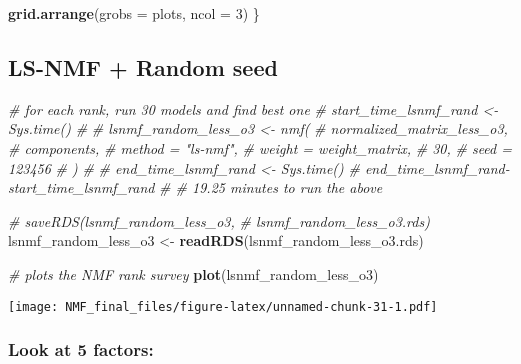 \documentclass[
]{article}
\newenvironment{Shaded}{\begin{snugshade}}{\end{snugshade}}
\newcommand{\AttributeTok}[1]{\textcolor[rgb]{0.13,0.29,0.53}{#1}}
\newcommand{\CommentTok}[1]{\textcolor[rgb]{0.56,0.35,0.01}{\textit{#1}}}
\newcommand{\DecValTok}[1]{\textcolor[rgb]{0.00,0.00,0.81}{#1}}
\newcommand{\FunctionTok}[1]{\textcolor[rgb]{0.13,0.29,0.53}{\textbf{#1}}}
\newcommand{\NormalTok}[1]{#1}
\newcommand{\OtherTok}[1]{\textcolor[rgb]{0.56,0.35,0.01}{#1}}
\newcommand{\SpecialCharTok}[1]{\textcolor[rgb]{0.81,0.36,0.00}{\textbf{#1}}}
\newcommand{\StringTok}[1]{\textcolor[rgb]{0.31,0.60,0.02}{#1}}
\begin{document}
\begin{Shaded}
\begin{Highlighting}[]
  
  \FunctionTok{grid.arrange}\NormalTok{(}\AttributeTok{grobs =}\NormalTok{ plots, }\AttributeTok{ncol =} \DecValTok{3}\NormalTok{)}
\NormalTok{\}}
\end{Highlighting}
\end{Shaded}

\subsection{LS-NMF + Random seed}\label{ls-nmf-random-seed}

\begin{Shaded}
\begin{Highlighting}[]
\CommentTok{\# for each rank, run 30 models and find best one}
\CommentTok{\# start\_time\_lsnmf\_rand \textless{}{-} Sys.time()}
\CommentTok{\# }
\CommentTok{\# lsnmf\_random\_less\_o3 \textless{}{-} nmf(}
\CommentTok{\#   normalized\_matrix\_less\_o3,}
\CommentTok{\#   components,}
\CommentTok{\#   method = "ls{-}nmf",}
\CommentTok{\#   weight = weight\_matrix,}
\CommentTok{\#   30,}
\CommentTok{\#   seed = 123456}
\CommentTok{\# )}
\CommentTok{\# }
\CommentTok{\# end\_time\_lsnmf\_rand \textless{}{-} Sys.time()}
\CommentTok{\# end\_time\_lsnmf\_rand{-}start\_time\_lsnmf\_rand}
\CommentTok{\# \# 19.25 minutes to run the above}

\CommentTok{\# saveRDS(lsnmf\_random\_less\_o3,}
\CommentTok{\#         \textquotesingle{}lsnmf\_random\_less\_o3.rds\textquotesingle{})}
\NormalTok{lsnmf\_random\_less\_o3 }\OtherTok{\textless{}{-}} \FunctionTok{readRDS}\NormalTok{(}\StringTok{\textquotesingle{}lsnmf\_random\_less\_o3.rds\textquotesingle{}}\NormalTok{)}
\end{Highlighting}
\end{Shaded}

\begin{Shaded}
\begin{Highlighting}[]
\CommentTok{\# plots the NMF rank survey}
\FunctionTok{plot}\NormalTok{(lsnmf\_random\_less\_o3)}
\end{Highlighting}
\end{Shaded}

\texttt{[image: NMF\_final\_files/figure-latex/unnamed-chunk-31-1.pdf]}

\subsubsection{Look at 5 factors:}\label{look-at-5-factors}

\begin{Shaded}
\end{Shaded}
\end{document}

